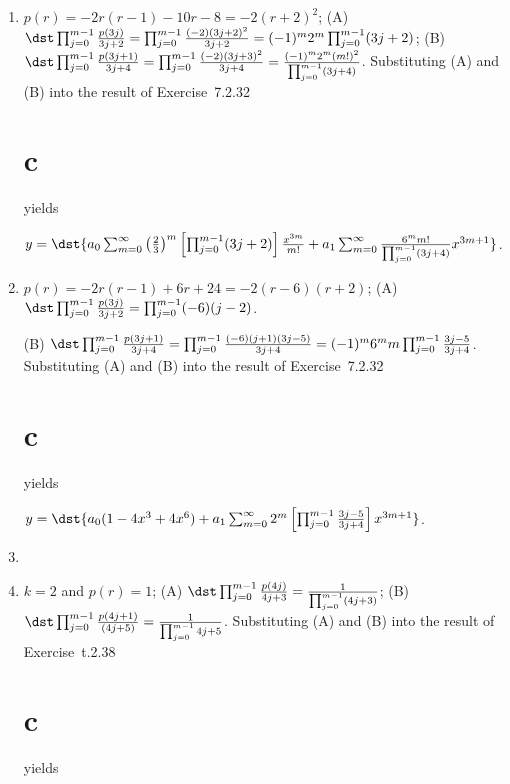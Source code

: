 \documentclass[openany]{book}
\newenvironment{sectionSolutions}{
 \begin{enumerate}[item-label={\thesection.\arabic{enumi}.}]
}{
 \end{enumerate}
}
\begin{document}
\begin{sectionSolutions}
\item $p(r)=-2r(r-1)-10r-8=-2(r+2)^2$;
(A) $\dst\prod_{j=0}^{m-1}\frac{p(3j)}{3j+2}=
\prod_{j=0}^{m-1}\frac{(-2)(3j+2)^2}{3j+2}
=(-1)^m2^m\prod_{j=0}^{m-1}(3j+2)$;
(B) $\dst\prod_{j=0}^{m-1}\frac{p(3j+1)}{3j+4}=
\prod_{j=0}^{m-1}\frac{(-2)(3j+3)^2}{3j+4}
=\frac{(-1)^m2^m(m!)^2}{\prod_{j=0}^{m-1}(3j+4)}$.
Substituting (A) and (B) into the
result of Exercise~7.2.32\part{c} yields

$y=\dst{a_0\sum_{m=0}^\infty
\left(\frac{2}{3}\right)^m\left[\prod_{j=0}^{m-1}(3j+2)\right]\frac{x^{3m}}{ m!}
+a_1\sum_{m=0}^\infty\frac{6^mm!}{\prod_{j=0}^{m-1}(3j+4)}x^{3m+1}}$.


\item $p(r)=-2r(r-1)+6r+24=-2(r-6)(r+2)$;
(A) $\dst\prod_{j=0}^{m-1}\frac{p(3j)}{3j+2}=\prod_{j=0}^{m-1}
(-6)(j-2)$.


(B) $\dst\prod_{j=0}^{m-1}\frac{p(3j+1)}{3j+4}=
\prod_{j=0}^{m-1}\frac{(-6)(j+1)(3j-5)}{3j+4}=
(-1)^m6^mm\prod_{j=0}^{m-1}\frac{3j-5}{3j+4}$.
Substituting (A) and (B) into the
result of Exercise~7.2.32\part{c} yields

$y=\dst{a_0(1-4x^3+4x^6)+a_1\sum_{m=0}^\infty
2^m\left[\prod_{j=0}^{m-1}\frac{3j-5}{3j+4}\right]x^{3m+1}}$.


\item
{}


\item $k=2$ and
$p(r)=1$;
(A) $\dst\prod_{j=0}^{m-1}\frac{p(4j)}{4j+3}=
\frac{1}{\prod_{j=0}^{m-1}(4j+3)}$;
(B) $\dst\prod_{j=0}^{m-1}\frac{p(4j+1)}{(4j+5)}=
\frac{1}{\prod_{j=0}^{m-1}4j+5}$.
Substituting (A) and (B) into the
result of Exercise~t.2.38\part{c} yields


\end{sectionSolutions}
\end{document}
